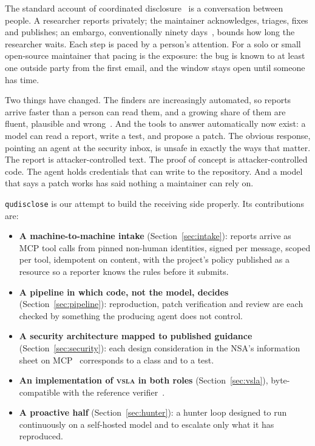 \documentclass[11pt]{article}
\newcommand{\qud}{\texttt{qudisclose}}
\newcommand{\vsla}{\textsc{vsla}}
\begin{document}
The standard account of coordinated disclosure~\cite{iso29147,iso30111,certcvd} is a conversation between
people. A researcher reports privately; the maintainer acknowledges, triages, fixes and publishes; an embargo,
conventionally ninety days~\cite{p0}, bounds how long the researcher waits. Each step is paced by a person's
attention. For a solo or small open-source maintainer that pacing is the exposure: the bug is known to at least
one outside party from the first email, and the window stays open until someone has time.

Two things have changed. The finders are increasingly automated, so reports arrive faster than a person can
read them, and a growing share of them are fluent, plausible and wrong~\cite{slopsurvey,herodevs}. And the tools
to answer automatically now exist: a model can read a report, write a test, and propose a patch. The obvious
response, pointing an agent at the security inbox, is unsafe in exactly the ways that matter. The report is
attacker-controlled text. The proof of concept is attacker-controlled code. The agent holds credentials that can
write to the repository. And a model that says a patch works has said nothing a maintainer can rely on.

\qud{} is our attempt to build the receiving side properly. Its contributions are:

\begin{itemize}[leftmargin=1.4em, itemsep=0.25em]
  \item \textbf{A machine-to-machine intake} (Section~\ref{sec:intake}): reports arrive as MCP tool calls from
  pinned non-human identities, signed per message, scoped per tool, idempotent on content, with the project's
  policy published as a resource so a reporter knows the rules before it submits.
  \item \textbf{A pipeline in which code, not the model, decides} (Section~\ref{sec:pipeline}): reproduction,
  patch verification and review are each checked by something the producing agent does not control.
  \item \textbf{A security architecture mapped to published guidance} (Section~\ref{sec:security}): each design
  consideration in the NSA's information sheet on MCP~\cite{nsamcp} corresponds to a class and to a test.
  \item \textbf{An implementation of \vsla{} in both roles} (Section~\ref{sec:vsla}), byte-compatible with the
  reference verifier~\cite{vsla}.
  \item \textbf{A proactive half} (Section~\ref{sec:hunter}): a hunter loop designed to run continuously on a
  self-hosted model and to escalate only what it has reproduced.
\end{itemize}
\end{document}
